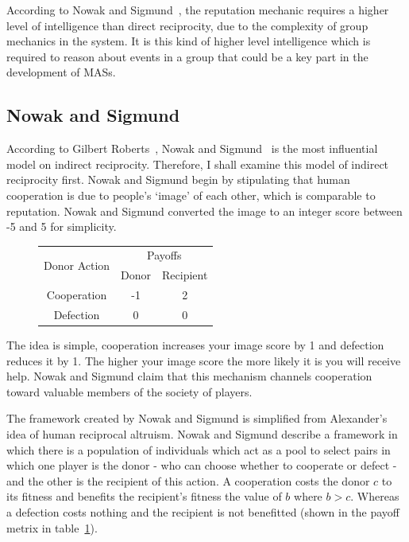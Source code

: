 \documentclass[]{final_report}
\begin{document}
According to Nowak and Sigmund~\cite{evol_indirect_image}, the reputation mechanic requires a higher level of intelligence than direct reciprocity, due to the complexity of group mechanics in the system. It is this kind of higher level intelligence which is required to reason about events in a group that could be a key part in the development of MASs.

\subsection{Nowak and Sigmund}
\label{sec:nowak_sig}
According to Gilbert Roberts~\cite{evoldirindir}, Nowak and Sigmund~\cite{evol_indirect_image} is the most influential model on indirect reciprocity. Therefore, I shall examine this model of indirect reciprocity first. Nowak and Sigmund begin by stipulating that human cooperation is due to people's `image' of each other, which is comparable to reputation. Nowak and Sigmund converted the image to an integer score between -5 and 5 for simplicity.\par
\begin{figure}
\vspace{-20pt}
\begin{framed}
	\begin{center}
		\begin{tabular}{c|c|c}
		\multirow{2}{*}{Donor Action} & \multicolumn{2}{c}{Payoffs}\\	
		& Donor & Recipient\\
		\hline
		Cooperation & -1 & 2\\
		\hline
		Defection & 0 & 0\\
		\end{tabular}
		\label{tab:indirrec_payoffmatrix}
	\end{center}	
\end{framed}
\vspace{-20pt}
\end{figure}
The idea is simple, cooperation increases your image score by 1 and defection reduces it by 1. The higher your image score the more likely it is you will receive help. Nowak and Sigmund claim that this mechanism channels cooperation toward valuable members of the society of players.\par
The framework created by Nowak and Sigmund is simplified from Alexander's~\cite{alexander1987biology} idea of human reciprocal altruism. Nowak and Sigmund describe a framework in which there is a population of individuals which act as a pool to select pairs in which one player is the donor - who can choose whether to cooperate or defect - and the other is the recipient of this action. A cooperation costs the donor $c$ to its fitness and benefits the recipient's fitness the value of $b$ where $b>c$. Whereas a defection costs nothing and the recipient is not benefitted (shown in the payoff metrix in table~\ref{tab:indirrec_payoffmatrix}).\par
\end{document}
